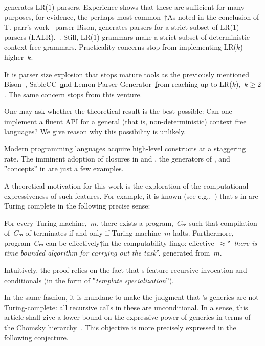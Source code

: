\Self generates LR($1$) parsers. Experience shows that these are
  sufficient for many purposes, for evidence, the perhaps most common~†{As noted in the conclusion of T\@. parr's work~\cite{Parr:1995}} parser Bison,
  generates parsers for a strict subset of LR($1$) parsers (LALR).~\cite{Bison:manual}.
Still, LR(1) grammars make a strict subset of deterministic context-free grammars.
Practicality concerns stop \Self from implementing LR($k$) higher~$k$.

It is parser size explosion that stops mature tools as the previously mentioned Bison~\cite{Bison:manual},
  SableCC~\href{http://www.sablecc.org} and Lemon Parser Generator~\href{http://www.hwaci.com/sw/lemon/}
  from reaching up to LR($k$),~$k≥2$.
The same concern stops \Self from this venture.

One may ask whether the theoretical result is the
  best possible:
Can one implement a fluent API for a general
  (that is, non-deterministic) context free languages?
We give reason why this possibility is unlikely.

Modern programming languages acquire high-level constructs
  at a staggering rate.
The imminent adoption of closures in \Java and \CC,
  the generators of \CSharp, and ‟concepts” in
  \CC are just a few examples.

A theoretical motivation for this work
  is the exploration of the computational
  expressiveness of such features.
For example, it is known (see e.g.,~\cite{Gutterman:2003}) that
  s in \CC are Turing complete in the following precise sense:

\begin{Theorem}
  \label{Theorem:Gutterman}
  For every Turing machine,~$m$, there exists a \CC program,~$Cₘ$ such that
    compilation of~$Cₘ$ of terminates if and only if
      Turing-machine~$m$ halts.
  Furthermore, program~$Cₘ$ can be effectively†{in the computability lingo:
    effective~$≈$‟~\emph{there is time
  bounded algorithm for carrying out the task}”.} generated from~$m$.
\end{Theorem}

Intuitively, the proof relies on the fact that s
  feature recursive invocation and conditionals (in the form of
  ‟\emph{template specialization}”).

In the same fashion, it is mundane to make the judgment that
  \Java's generics are not Turing-complete: all recursive calls
  in these are unconditional.
In a sense, this article shall give a lower bound on the
  expressive power of \Java generics in terms of the Chomsky hierarchy~\cite{Chomsky:1963}.
This objective is more precisely expressed in the following conjecture.

